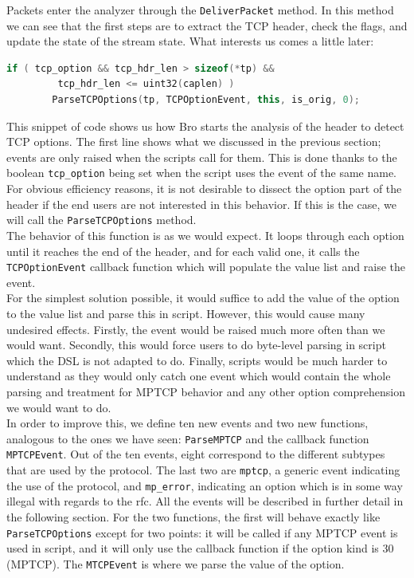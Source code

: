 \documentclass[12pt, a4paper, oneside]{article} %
\begin{document}
Packets enter the analyzer through the \texttt{DeliverPacket} method. In this method we can see that the first steps are to extract the TCP header, check the flags, and update the state of the stream state. What interests us comes a little later:

\begin{lstlisting}[language = C++]
	if ( tcp_option && tcp_hdr_len > sizeof(*tp) &&
	     tcp_hdr_len <= uint32(caplen) )
		ParseTCPOptions(tp, TCPOptionEvent, this, is_orig, 0);
\end{lstlisting}

This snippet of code shows us how Bro starts the analysis of the header to detect TCP options. The first line shows what we discussed in the previous section; events are only raised when the scripts call for them. This is done thanks to the boolean \texttt{tcp\_option} being set when the script uses the event of the same name. For obvious efficiency reasons, it is not desirable to dissect the option part of the header if the end users are not interested in this behavior. If this is the case, we will call the \texttt{ParseTCPOptions} method. \\

The behavior of this function is as we would expect. It loops through each option until it reaches the end of the header, and for each valid one, it calls the \texttt{TCPOptionEvent} callback function which will populate the value list and raise the event. \\

For the simplest solution possible, it would suffice to add the value of the option to the value list and parse this in script. However, this would cause many undesired effects. Firstly, the event would be raised much more often than we would want. Secondly, this would force users to do byte-level parsing in script which the DSL is not adapted to do. Finally, scripts would be much harder to understand as they would only catch one event which would contain the whole parsing and treatment for MPTCP behavior and any other option comprehension we would want to do. \\

In order to improve this, we define ten new events and two new functions, analogous to the ones we have seen: \texttt{ParseMPTCP} and the callback function \texttt{MPTCPEvent}. Out of the ten events, eight correspond to the different subtypes that are used by the protocol. The last two are \texttt{mptcp}, a generic event indicating the use of the protocol, and \texttt{mp\_error}, indicating an option which is in some way illegal with regards to the rfc. All the events will be described in further detail in the following section. For the two functions, the first will behave exactly like \texttt{ParseTCPOptions} except for two points: it will be called if any MPTCP event is used in script, and it will only use the callback function if the option kind is 30 (MPTCP). The \texttt{MTCPEvent} is where we parse the value of the option. \\
\end{document}
